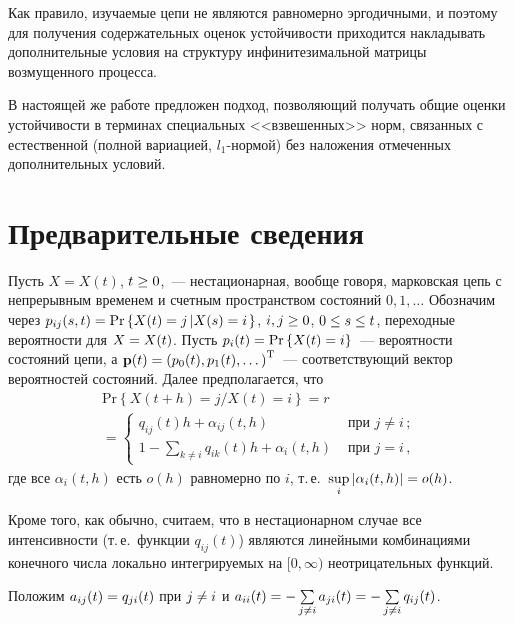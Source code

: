 \begin{multicols}{2}
{}


Как правило, изучаемые цепи не являются равномерно эргодичными, и поэтому
для получения содержательных
оценок устойчивости приходится накладывать дополнительные условия на структуру
инфинитезимальной матрицы возмущенного процесса.


В настоящей же работе предложен подход, поз\-во\-ля\-ющий получать общие оценки устойчивости
в терминах специальных
<<взвешенных>> норм, связанных с естественной (полной вариацией, $l_1$-нор\-мой)
без наложения отмеченных дополнительных условий.


\section{Предварительные сведения}

Пусть $X=X(t)$, $t\hm\geq 0$,~--- нестационарная, вообще говоря, марковская
цепь с непрерывным временем и счетным пространством
состояний $0,1,\dots$ Обозначим через $p_{ij}(s,t)\hm=
\mathrm{Pr}\left\{ X(t)\hm=j\left| X(s)\hm=i\right. \right\}$,
$i,j \hm\ge 0$, $0\hm\leq s\hm\leq t$, переходные вероятности для $X\hm=X(t)$.
Пусть $p_i(t)\hm=\mathrm{Pr}\left\{ X(t) \hm=i \right\}$~--- вероятности
состояний цепи, а ${\bf p}(t) \hm= \left(p_0(t), p_1(t), \dots\right)^{\mathrm{T}}$~---
соответствующий вектор вероятностей состояний.
Далее предполагается, что
\begin{multline*}
\mathrm{Pr}\left\{X\left( t+h\right) =j/X\left( t\right) =i\right\} ={}r\\
{}=  \begin{cases}
q_{ij}\left( t\right)  h+\alpha_{ij}\left(t, h\right) & \mbox { при }j\neq i\,;\\
1-\sum\limits_{k\neq i}q_{ik}\left( t\right)  h+\alpha_{i}\left(
t,h\right) & \mbox { при } j=i\,,
\end{cases}
\end{multline*}
где все  $\alpha_{i}(t,h)$ есть $o(h)$ равномерно по  $i$, т.\,е.\
$\sup\limits_i |\alpha_i(t,h)| \hm= o(h)$.

Кроме того, как обычно, считаем, что в нестационарном случае все интенсивности
(т.\,е.\ функции $q_{ij}\left( t\right) $) являются линейными комбинациями конечного
чис\-ла локально интегрируемых на $[0,\infty)$ не\-от\-ри\-ца\-тель\-ных функций.

Положим $a_{ij}(t) \hm=  q_{ji}(t)$ при $j\hm\neq i$ и $a_{ii}(t)\hm =
-\sum\limits_{j\neq i} a_{ji}(t) \hm= -\sum\limits_{j\neq i} q_{ij}(t)$.


\end{multicols}
